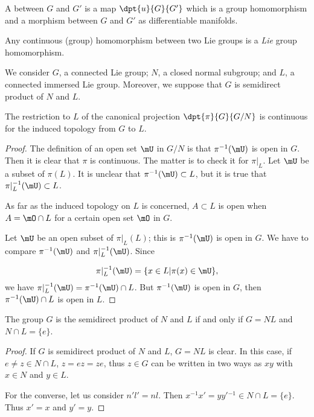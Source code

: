 \begin{definition}
	A  between $G$ and $G'$ is a map $\dpt{u}{G}{G'}$ which is a group homomorphism and a morphism between $G$ and $G'$ as differentiable manifolds.
\end{definition}

\begin{lemma}
	Any continuous (group) homomorphism between two Lie groups is a \emph{Lie} group homomorphism.
\end{lemma}

We consider $G$, a connected Lie group; $N$, a closed normal subgroup; and $L$, a connected immersed Lie group. Moreover, we suppose that $G$ is semidirect product of $N$ and $L$.

\begin{proposition}
	The restriction to $L$ of the canonical projection $\dpt{\pi}{G}{G/N}$ is continuous for the induced topology from $G$ to $L$.
\end{proposition}
\begin{proof}
	The definition of an open set $\mU$ in $G/N$ is that $\pi^{-1}(\mU)$ is open in $G$. Then it is clear that $\pi$ is continuous. The matter is to check it for $\pi|_L$. Let $\mU$ be a subset of $\pi(L)$. It is unclear that $\pi^{-1}(\mU)\subset L$, but it is true that $\pi|_L^{-1}(\mU)\subset L$.

	As far as the induced topology on $L$ is concerned, $A\subset L$ is open when $A=\mO\cap L$ for a certain open set $\mO$ in $G$.

	Let $\mU$ be an open subset of $\pi|_L(L)$; this is $\pi^{-1}(\mU)$ is open in $G$. We have to compare $\pi^{-1}(\mU)$ and $\pi|_L^{-1}(\mU)$. Since

	\[
		\pi|_L^{-1}(\mU)=\{x\in L|\pi(x)\in\mU\},
	\]
	we have $\pi|_L^{-1}(\mU)=\pi^{-1}(\mU)\cap L$. But $\pi^{-1}(\mU)$ is open in $G$, then $\pi^{-1}(\mU)\cap L$ is open in $L$.
\end{proof}

\begin{proposition}
	The group $G$ is the semidirect product of $N$ and $L$ if and only if $G=NL$ and $N\cap L=\{e\}$.
\end{proposition}

\begin{proof}

	If $G$ is semidirect product of $N$ and $L$, $G=NL$ is clear. In this case, if $e\neq z\in N\cap L$, $z=ez=ze$, thus $z\in G$ can be written in two ways as $xy$ with $x\in N$ and $y\in L$.

	For the converse, let us consider $n'l'=nl$. Then $x^{-1} x'=yy'{}^{-1}\in N\cap L=\{e\}$. Thus $x'=x$ and $y'=y$.
\end{proof}

